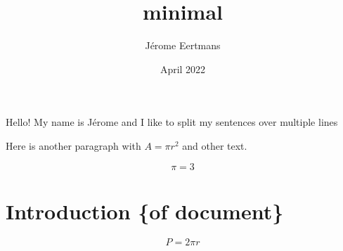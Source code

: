 \documentclass{article}
\title{minimal}
\author{Jérome Eertmans}
\date{April 2022}
\begin{document}
\maketitle %

Hello! My name is Jérome and I like to
split my sentences over multiple lines

Here is another paragraph with $ A = \pi r^2 $ and other text.

$$ \pi = 3 $$

\section{Introduction \{of document\}}

    \begin{equation}
        P = 2 \pi r
    \end{equation}
\end{document}
